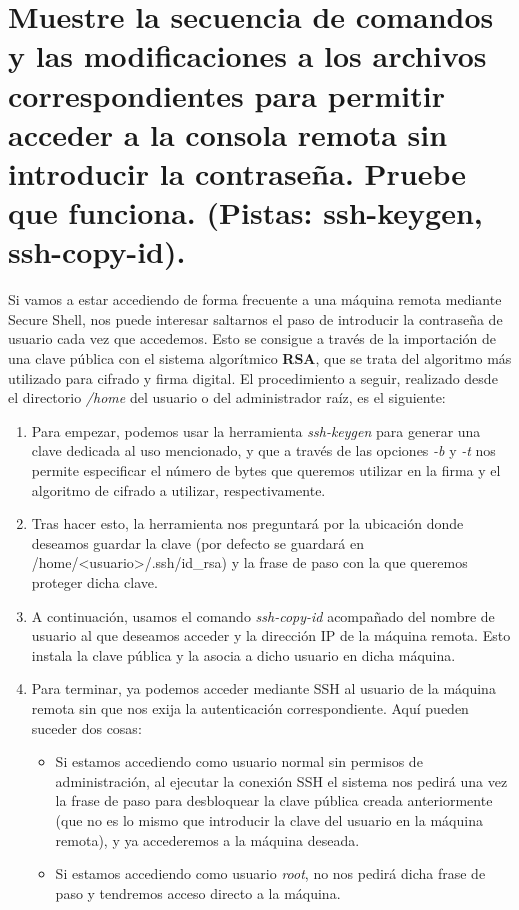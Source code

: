 \section{Muestre la secuencia de comandos y las modificaciones a los archivos correspondientes para permitir acceder a la consola remota sin introducir la contraseña. Pruebe que funciona. (Pistas: ssh-keygen, ssh-copy-id).}
Si vamos a estar accediendo de forma frecuente a una máquina remota mediante Secure Shell, nos puede interesar saltarnos el paso de introducir la contraseña de usuario cada vez que accedemos. Esto se consigue a través de la importación de una clave pública con el sistema algorítmico \textbf{RSA}, que se trata del algoritmo más utilizado para cifrado y firma digital. El procedimiento a seguir, realizado desde el directorio \emph{/home} del usuario o del administrador raíz, es el siguiente:
\begin{enumerate}[1.]
	\item Para empezar, podemos usar la herramienta \emph{ssh-keygen} para generar una clave dedicada al uso mencionado, y que a través de las opciones \emph{-b} y \emph{-t} nos permite especificar el número de bytes que queremos utilizar en la firma y el algoritmo de cifrado a utilizar, respectivamente.
	\item Tras hacer esto, la herramienta nos preguntará por la ubicación donde deseamos guardar la clave (por defecto se guardará en /home/<usuario>/.ssh/id\_rsa) y la frase de paso con la que queremos proteger dicha clave.
	\item A continuación, usamos el comando \emph{ssh-copy-id} acompañado del nombre de usuario al que deseamos acceder y la dirección IP de la máquina remota. Esto instala la clave pública y la asocia a dicho usuario en dicha máquina.
	\item Para terminar, ya podemos acceder mediante SSH al usuario de la máquina remota sin que nos exija la autenticación correspondiente. Aquí pueden suceder dos cosas:
	\begin{itemize}
		\item Si estamos accediendo como usuario normal sin permisos de administración, al ejecutar la conexión SSH el sistema nos pedirá una vez la frase de paso para desbloquear la clave pública creada anteriormente (que no es lo mismo que introducir la clave del usuario en la máquina remota), y ya accederemos a la máquina deseada.
		\item Si estamos accediendo como usuario \emph{root}, no nos pedirá dicha frase de paso y tendremos acceso directo a la máquina.
	\end{itemize}
\end{enumerate}
